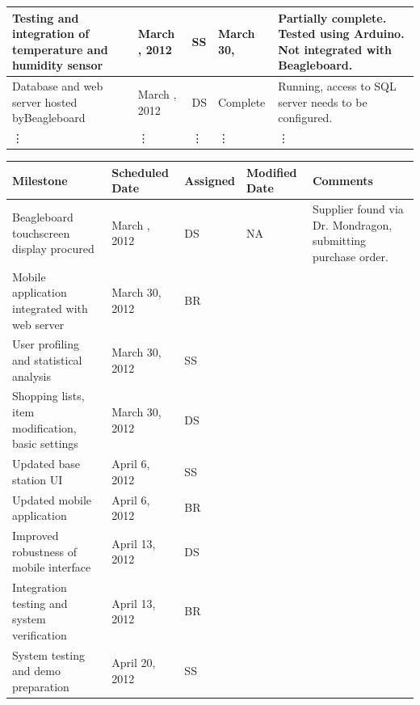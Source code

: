 \documentclass[11pt,letterpaper]{article}
\begin{document}
\begin{table}[h!]
\begin{center}
\begin{tabular}{| p{3.5 cm} | p{2 cm} | p{2 cm}| p{2 cm} | p{6 cm} | }
\hline
Testing and \newline integration of \newline temperature and \newline humidity sensor & March \newline 16,  2012 &SS & March 30, \newline 2012 & Partially complete. Tested using Arduino. Not integrated with \newline Beagleboard. \\
\hline
Database and web server hosted by\newline Beagleboard & March \newline 16, 2012 & DS & Complete & Running, access to SQL server needs to be configured.\\
\hline
\vdots & \vdots & \vdots & \vdots & \vdots \\
\hline
\end{tabular}
\end{center}
\end{table}

\begin{table}[h!]
\begin{center}
\begin{tabular}{| p{3.5 cm} | p{2 cm} | p{2 cm}| p{2 cm} | p{6 cm} | }
\hline
\textbf{Milestone} & \textbf{Scheduled Date} & \textbf{Assigned} & \textbf{Modified Date} & \textbf{Comments} \\
\hline

Beagleboard \newline touchscreen display procured & March \newline 16, 2012 & DS & NA & Supplier found via Dr. Mondragon, submitting purchase order. \\
\hline
Mobile application integrated with web server & March 30, 2012 &BR & & \\
\hline
User profiling and statistical analysis & March 30, 2012 & SS & & \\
\hline 
Shopping lists, item modification, basic settings & March 30, 2012 & DS & &\\
\hline
Updated base station UI & April 6, 2012 & SS & & \\
\hline
Updated mobile application & April 6, 2012 & BR & & \\
\hline
Improved robustness of mobile interface& April 13, 2012 & DS & & \\
\hline
Integration testing and system verification & April 13, 2012 & BR & & \\
\hline
System testing and demo preparation & April 20, 2012 & SS & & \\
\hline
\end{tabular}
\label {MilestoneTable}
\end{center}
\end{table}
\end{document}
